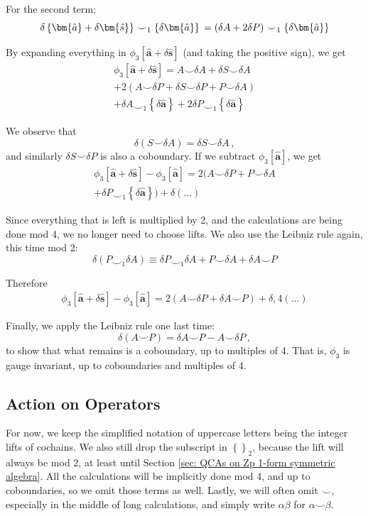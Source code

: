 \documentclass[aps,twocolumn,prx,floatfix,preprintnumbers, nofootinbib,10pt]{revtex4-2}
\numberwithin{equation}{section}
\theoremstyle{definition}
\theoremstyle{remark}
\theoremstyle{claim}
\newcommand{\be}{\begin{equation}}
\newcommand{\ee}{\end{equation}}
\newcommand{\lb}{\left(}
\newcommand{\rb}{\right)}
\newcommand{\lbbb}{\left\{}
\newcommand{\rbbb}{\right\}}
\newcommand{\lrb}[1]{\lbbb #1 \rbbb}
\begin{document}
For the second term:
\be
\delta \lrb{\bm{\hat{a}} + \delta \bm{\hat{s}}} \smile_1 \lrb{\delta \bm{\hat{a}}} \\
= \lb \delta A + 2 \delta P \rb \smile_1 \lrb{\delta \bm{\hat{a}}}
\ee

By expanding everything in $\phi_3[\bm{\hat{a}} + \delta \bm{\hat{s}}]$ (and taking the positive sign), we get
\begin{multline}
 \phi_3[\bm{\hat{a}} + \delta \bm{\hat{s}}] = A \smile \delta A + \delta S \smile \delta A \\
 + 2 (A \smile \delta P + \delta S \smile \delta P + P \smile \delta A) \\
 + \delta A \smile_1 \lrb{\delta \bm{\hat{a}}} + 2 \delta P \smile_1 \lrb{\delta \bm{\hat{a}}}
\end{multline}

We observe that
\be
\delta (S \smile \delta A) = \delta S \smile \delta A \,,
\ee
and similarly $\delta S \smile \delta P$ is also a coboundary. If we subtract $\phi_3[\bm{\hat{a}}]$, we get
\begin{multline}
 \phi_3[\bm{\hat{a}} + \delta \bm{\hat{s}}] - \phi_3[\bm{\hat{a}}] = 2 (A \smile \delta P + P \smile \delta A \\
 + \delta P \smile_1 \lrb{\delta \bm{\hat{a}}}) + \delta (\dots)
\end{multline}

Since everything that is left is multiplied by 2, and the calculations are being done mod 4, we no longer need to choose lifts. We also use the Leibniz rule again, this time mod 2:
\be
\delta (P \smile_1 \delta A) \equiv \delta P \smile_1 \delta A + P \smile \delta A + \delta A \smile P
\ee

Therefore
\begin{multline}
 \phi_3[\bm{\hat{a}} + \delta \bm{\hat{s}}] - \phi_3[\bm{\hat{a}}] = 2 (A \smile \delta P + \delta A \smile P) + \delta,4 (\dots)
\end{multline}

Finally, we apply the Leibniz rule one last time:
\be
\delta (A \smile P) = \delta A \smile P - A \smile \delta P \,,
\ee
to show that what remains is a coboundary, up to multiples of 4. That is, $\phi_3$ is gauge invariant, up to coboundaries and multiples of 4.

\subsection{Action on Operators}

For now, we keep the simplified notation of uppercase letters being the integer lifts of cochains. We also still drop the subscript in $\lrb{}_2$, because the lift will always be mod 2, at least until Section \ref{sec: QCAs on Zp 1-form symmetric algebra}. All the calculations will be implicitly done mod 4, and up to coboundaries, so we omit those terms as well. Lastly, we will often omit $\smile$, especially in the middle of long calculations, and simply write $\alpha \beta$ for $\alpha \smile \beta$.
\end{document}
